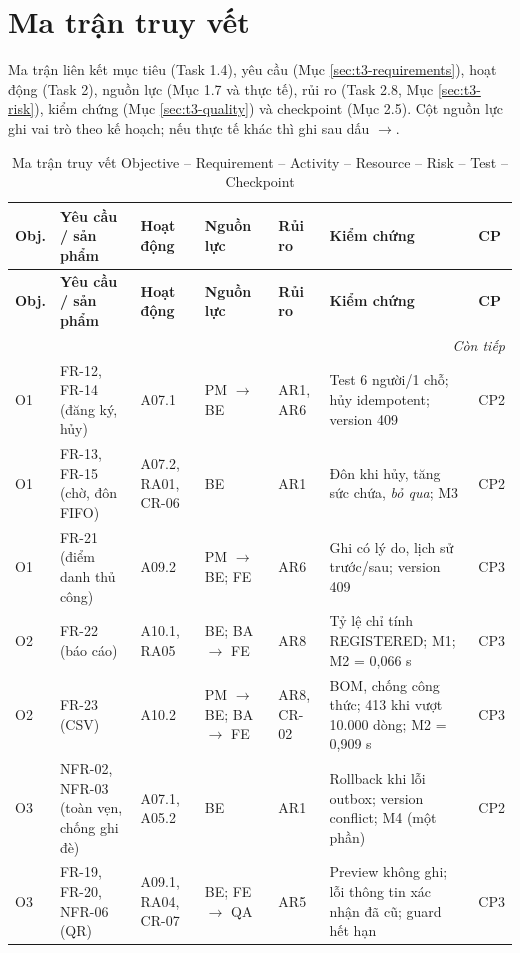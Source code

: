 \section{Ma trận truy vết}
\label{sec:traceability}

Ma trận liên kết mục tiêu (Task 1.4), yêu cầu (Mục \ref{sec:t3-requirements}), hoạt động (Task 2), nguồn lực (Mục 1.7 và thực tế), rủi ro (Task 2.8, Mục \ref{sec:t3-risk}), kiểm chứng (Mục \ref{sec:t3-quality}) và checkpoint (Mục 2.5). Cột nguồn lực ghi vai trò theo kế hoạch; nếu thực tế khác thì ghi sau dấu $\to$.

\begingroup\footnotesize
\renewcommand{\arraystretch}{1.2}
\begin{longtable}{@{}p{.06\linewidth}p{.16\linewidth}p{.13\linewidth}p{.13\linewidth}p{.11\linewidth}p{.22\linewidth}p{.07\linewidth}@{}}
\caption{Ma trận truy vết Objective -- Requirement -- Activity -- Resource -- Risk -- Test -- Checkpoint}\label{tab:traceability}\\
\toprule
\textbf{Obj.} & \textbf{Yêu cầu / sản phẩm} & \textbf{Hoạt động} & \textbf{Nguồn lực} & \textbf{Rủi ro} & \textbf{Kiểm chứng} & \textbf{CP}\\\midrule\endfirsthead
\toprule
\textbf{Obj.} & \textbf{Yêu cầu / sản phẩm} & \textbf{Hoạt động} & \textbf{Nguồn lực} & \textbf{Rủi ro} & \textbf{Kiểm chứng} & \textbf{CP}\\\midrule\endhead
\midrule\multicolumn{7}{r}{\textit{Còn tiếp}}\\\endfoot
\bottomrule\endlastfoot
O1 & FR-12, FR-14 (đăng ký, hủy) & A07.1 & PM $\to$ BE & AR1, AR6 & Test 6 người/1 chỗ; hủy idempotent; version 409 & CP2\\
O1 & FR-13, FR-15 (chờ, đôn FIFO) & A07.2, RA01, CR-06 & BE & AR1 & Đôn khi hủy, tăng sức chứa, \textit{bỏ qua}; M3 & CP2\\
O1 & FR-21 (điểm danh thủ công) & A09.2 & PM $\to$ BE; FE & AR6 & Ghi có lý do, lịch sử trước/sau; version 409 & CP3\\
O2 & FR-22 (báo cáo) & A10.1, RA05 & BE; BA $\to$ FE & AR8 & Tỷ lệ chỉ tính REGISTERED; M1; M2 = 0,066 s & CP3\\
O2 & FR-23 (CSV) & A10.2 & PM $\to$ BE; BA $\to$ FE & AR8, CR-02 & BOM, chống công thức; 413 khi vượt 10.000 dòng; M2 = 0,909 s & CP3\\
O3 & NFR-02, NFR-03 (toàn vẹn, chống ghi đè) & A07.1, A05.2 & BE & AR1 & Rollback khi lỗi outbox; version conflict; M4 (một phần) & CP2\\
O3 & FR-19, FR-20, NFR-06 (QR) & A09.1, RA04, CR-07 & BE; FE $\to$ QA & AR5 & Preview không ghi; lỗi thông tin xác nhận đã cũ; guard hết hạn & CP3\\

\end{longtable}
